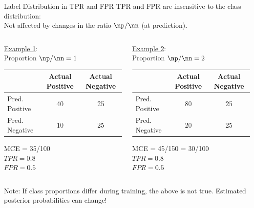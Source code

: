 \documentclass[11pt,compress,t,notes=noshow, xcolor=table]{beamer}
\begin{document}
\begin{vbframe}{Label Distribution in TPR and FPR}
TPR and FPR are insensitive to the class distribution:\\
Not affected by changes in the ratio $\np/\nn$ (at prediction).\\

\begin{columns}
\begin{column}{0.45\textwidth}

\underline{Example 1}:\\
Proportion $\np/\nn = 1$\\

\lz

{
\tiny
\centering
\tiny
\begin{tabular}{|l|c|c|}
                \hline
               & Actual Positive & Actual Negative \\ \hline
Pred. Positive & 40            & 25            \\ \hline
Pred. Negative & 10            & 25           \\ \hline
\end{tabular}
}

\lz

MCE = 35/100\\
$TPR = 0.8$\\
$FPR = 0.5$

\end{column}
\begin{column}{0.45\textwidth}

\underline{Example 2}:\\
Proportion $\np/\nn = 2$\\

\lz

{
\tiny
\begin{tabular}{|l|c|c|}
                \hline
               & Actual Positive & Actual Negative \\ \hline
Pred. Positive & 80            & 25            \\ \hline
Pred. Negative & 20            & 25           \\ \hline
\end{tabular}
}

\lz

MCE = 45/150 = 30/100\\
$TPR = 0.8$\\
$FPR = 0.5$
\end{column}
\end{columns}



\lz

Note: If class proportions differ during training, the above is not true. Estimated posterior probabilities can change!

\end{vbframe}
\end{document}
